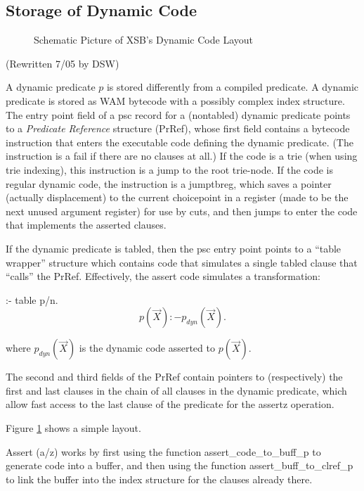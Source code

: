 \documentclass[11pt]{article}
\begin{document}
\subsection{Storage of Dynamic Code}

\begin{figure}[htbp]
\caption{Schematic Picture of XSB's Dynamic Code Layout}
\label{fig:dynamic-code}
\end{figure}

(Rewritten 7/05 by DSW)

A dynamic predicate $p$ is stored differently from a compiled
predicate.  A dynamic predicate is stored as WAM bytecode with a
possibly complex index structure.  The entry point field of a psc
record for a (nontabled) dynamic predicate points to a {\em Predicate
Reference} structure (PrRef), whose first field contains a bytecode
instruction that enters the executable code defining the dynamic
predicate.  (The instruction is a fail if there are no clauses at
all.)  If the code is a trie (when using trie indexing), this
instruction is a jump to the root trie-node.  If the code is regular
dynamic code, the instruction is a jumptbreg, which saves a pointer
(actually displacement) to the current choicepoint in a register (made
to be the next unused argument register) for use by cuts, and then
jumps to enter the code that implements the asserted clauses.

If the dynamic predicate is tabled, then the psc entry point points to
a ``table wrapper'' structure which contains code that simulates a
single tabled clause that ``calls'' the PrRef.  Effectively, the
assert code simulates a transformation:
\begin{center}
:- table p/n.
\[
p(\vec{X}):- p_{dyn}(\vec{X}). 
\]
\end{center}
where $p_{dyn}(\vec{X})$ is the dynamic code asserted to $p(\vec{X})$.

The second and third fields of the PrRef contain pointers to
(respectively) the first and last clauses in the chain of all clauses
in the dynamic predicate, which allow fast access to the last clause
of the predicate for the assertz operation.

Figure \ref{fig:dynamic-code} shows a simple layout.

Assert (a/z) works by first using the function
assert\_code\_to\_buff\_p to generate code into a buffer, and then using
the function assert\_buff\_to\_clref\_p to link the buffer into the index
structure for the clauses already there.
\end{document}
